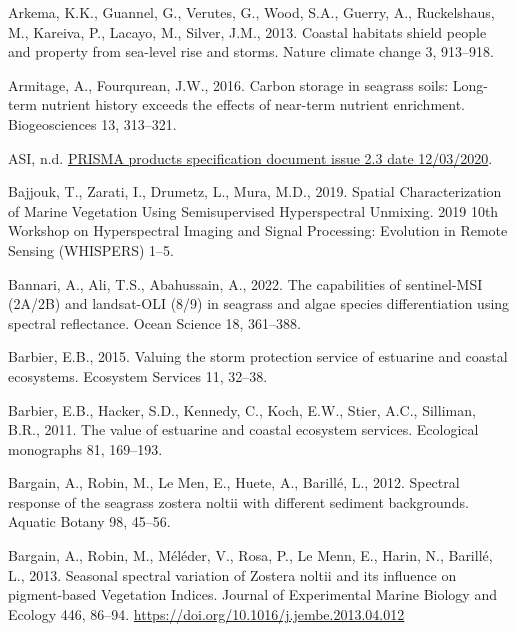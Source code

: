 \documentclass[
  letterpaper,
  11pt,
  english,
  singlespacing,
  headsepline]{MastersDoctoralThesis}
\newlength{\cslhangindent}
\newenvironment{CSLReferences}[2] %
 {\begin{list}{}{%
  \setlength{\itemindent}{0pt}
  \setlength{\leftmargin}{0pt}
  \setlength{\parsep}{0pt}
  \ifodd #1
   \setlength{\leftmargin}{\cslhangindent}
   \setlength{\itemindent}{-1\cslhangindent}
  \fi
  \setlength{\itemsep}{#2\baselineskip}}}
 {\end{list}}
\begin{document}
\begin{CSLReferences}{1}{0}
Arkema, K.K., Guannel, G., Verutes, G., Wood, S.A., Guerry, A.,
Ruckelshaus, M., Kareiva, P., Lacayo, M., Silver, J.M., 2013. Coastal
habitats shield people and property from sea-level rise and storms.
Nature climate change 3, 913--918.

Armitage, A., Fourqurean, J.W., 2016. Carbon storage in seagrass soils:
Long-term nutrient history exceeds the effects of near-term nutrient
enrichment. Biogeosciences 13, 313--321.

ASI, n.d.
\href{http://prisma.asi.it/missionselect/docs/PRISMA\%20Product\%20Specifications_Is2_3.pdf}{PRISMA
products specification document issue 2.3 date 12/03/2020}.

Bajjouk, T., Zarati, I., Drumetz, L., Mura, M.D., 2019. {Spatial
Characterization of Marine Vegetation Using Semisupervised Hyperspectral
Unmixing}. 2019 10th Workshop on Hyperspectral Imaging and Signal
Processing: Evolution in Remote Sensing (WHISPERS) 1--5.

Bannari, A., Ali, T.S., Abahussain, A., 2022. The capabilities of
sentinel-MSI (2A/2B) and landsat-OLI (8/9) in seagrass and algae species
differentiation using spectral reflectance. Ocean Science 18, 361--388.

Barbier, E.B., 2015. Valuing the storm protection service of estuarine
and coastal ecosystems. Ecosystem Services 11, 32--38.

Barbier, E.B., Hacker, S.D., Kennedy, C., Koch, E.W., Stier, A.C.,
Silliman, B.R., 2011. The value of estuarine and coastal ecosystem
services. Ecological monographs 81, 169--193.

Bargain, A., Robin, M., Le Men, E., Huete, A., Barillé, L., 2012.
Spectral response of the seagrass zostera noltii with different sediment
backgrounds. Aquatic Botany 98, 45--56.

Bargain, A., Robin, M., Méléder, V., Rosa, P., Le Menn, E., Harin, N.,
Barillé, L., 2013. {Seasonal spectral variation of Zostera noltii and
its influence on pigment-based Vegetation Indices}. Journal of
Experimental Marine Biology and Ecology 446, 86--94.
\url{https://doi.org/10.1016/j.jembe.2013.04.012}


\end{CSLReferences}
\end{document}
